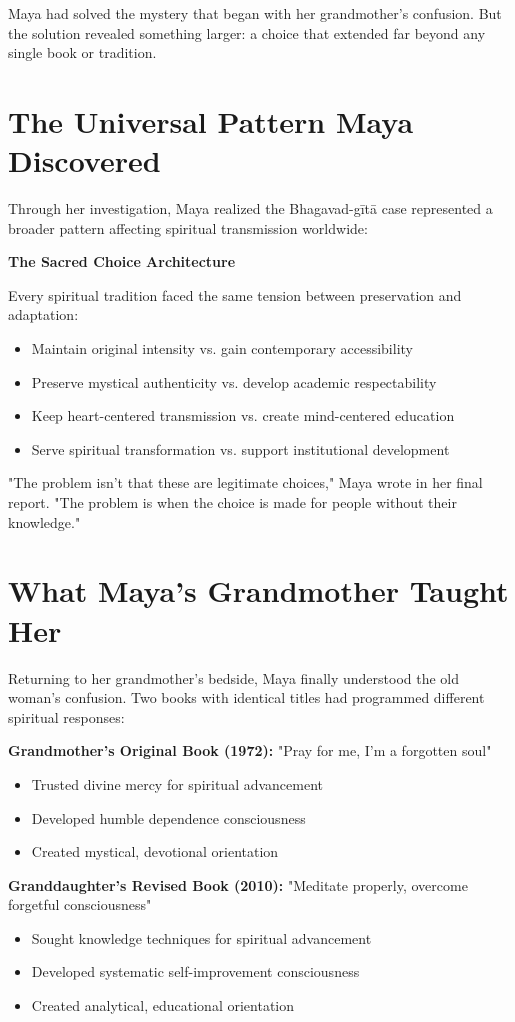 \documentclass[11pt,twoside]{book}
\begin{document}
Maya had solved the mystery that began with her grandmother's confusion. But the solution revealed something larger: a choice that extended far beyond any single book or tradition.
\section*{The Universal Pattern Maya Discovered}
\label{sec:orga363eaf}

Through her investigation, Maya realized the Bhagavad-gītā case represented a broader pattern affecting spiritual transmission worldwide:

\textbf{\textbf{The Sacred Choice Architecture}}

Every spiritual tradition faced the same tension between preservation and adaptation:
\begin{itemize}
\item Maintain original intensity vs. gain contemporary accessibility
\item Preserve mystical authenticity vs. develop academic respectability
\item Keep heart-centered transmission vs. create mind-centered education
\item Serve spiritual transformation vs. support institutional development
\end{itemize}

"The problem isn't that these are legitimate choices," Maya wrote in her final report. "The problem is when the choice is made for people without their knowledge."
\section*{What Maya's Grandmother Taught Her}
\label{sec:org5d2b9a7}

Returning to her grandmother's bedside, Maya finally understood the old woman's confusion. Two books with identical titles had programmed different spiritual responses:

\textbf{\textbf{Grandmother's Original Book (1972):}}
"Pray for me, I'm a forgotten soul"
\begin{itemize}
\item Trusted divine mercy for spiritual advancement
\item Developed humble dependence consciousness
\item Created mystical, devotional orientation
\end{itemize}

\textbf{\textbf{Granddaughter's Revised Book (2010):}}
"Meditate properly, overcome forgetful consciousness"  
\begin{itemize}
\item Sought knowledge techniques for spiritual advancement
\item Developed systematic self-improvement consciousness
\item Created analytical, educational orientation
\end{itemize}
\end{document}
